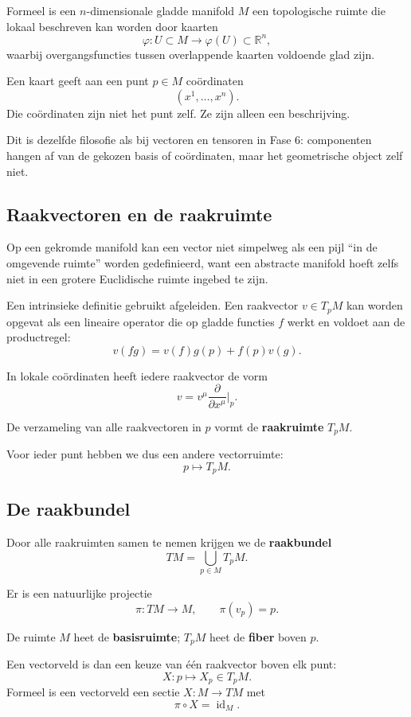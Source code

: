 \documentclass[11pt,a4paper]{article}
\newcommand{\R}{\mathbb{R}}
\begin{document}
Formeel is een $n$-dimensionale gladde manifold $M$ een topologische ruimte die lokaal beschreven kan worden door kaarten
\[
\varphi: U \subset M \longrightarrow \varphi(U) \subset \R^n,
\]
waarbij overgangsfuncties tussen overlappende kaarten voldoende glad zijn.

Een kaart geeft aan een punt $p\in M$ coördinaten
\[
(x^1,\dots,x^n).
\]
Die coördinaten zijn niet het punt zelf. Ze zijn alleen een beschrijving.

\begin{brug}
Dit is dezelfde filosofie als bij vectoren en tensoren in Fase 6: componenten hangen af van de gekozen basis of coördinaten, maar het geometrische object zelf niet.
\end{brug}

\subsection{Raakvectoren en de raakruimte}

Op een gekromde manifold kan een vector niet simpelweg als een pijl ``in de omgevende ruimte'' worden gedefinieerd, want een abstracte manifold hoeft zelfs niet in een grotere Euclidische ruimte ingebed te zijn.

Een intrinsieke definitie gebruikt afgeleiden. Een raakvector $v\in T_pM$ kan worden opgevat als een lineaire operator die op gladde functies $f$ werkt en voldoet aan de productregel:
\[
v(fg)=v(f)g(p)+f(p)v(g).
\]

In lokale coördinaten heeft iedere raakvector de vorm
\[
v=v^\mu\frac{\partial}{\partial x^\mu}\Big|_p.
\]

De verzameling van alle raakvectoren in $p$ vormt de \textbf{raakruimte} $T_pM$.

Voor ieder punt hebben we dus een andere vectorruimte:
\[
p\mapsto T_pM.
\]

\subsection{De raakbundel}

Door alle raakruimten samen te nemen krijgen we de \textbf{raakbundel}
\[
TM=\bigcup_{p\in M}T_pM.
\]

Er is een natuurlijke projectie
\[
\pi:TM\to M,
\qquad
\pi(v_p)=p.
\]

De ruimte $M$ heet de \textbf{basisruimte}; $T_pM$ heet de \textbf{fiber} boven $p$.

Een vectorveld is dan een keuze van één raakvector boven elk punt:
\[
X:p\mapsto X_p\in T_pM.
\]
Formeel is een vectorveld een sectie $X:M\to TM$ met
\[
\pi\circ X=\operatorname{id}_M.
\]
\end{document}
